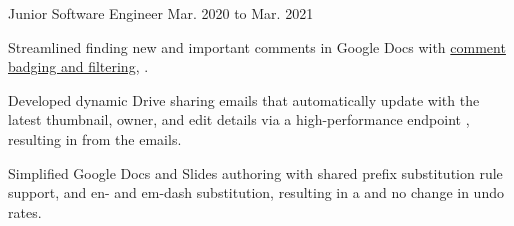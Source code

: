 \begin{cventry}
    {}
    {Junior Software Engineer}
    {Mar. 2020 to Mar. 2021}{}
    \begin{cvitems}
        \item Streamlined finding new and important comments in Google Docs with \href{https://workspaceupdates.googleblog.com/2021/02/improvements-for-locating-new-comments-important-conversations-google-docs.html}{comment badging and filtering}, .
        \item Developed dynamic Drive sharing emails that automatically update with the latest thumbnail, owner, and edit details via a high-performance endpoint , resulting in  from the emails.
        \item Simplified Google Docs and Slides authoring with shared prefix substitution rule support, and en- and em-dash substitution, resulting in a  and no change in undo rates.
    \end{cvitems}
\end{cventry}
